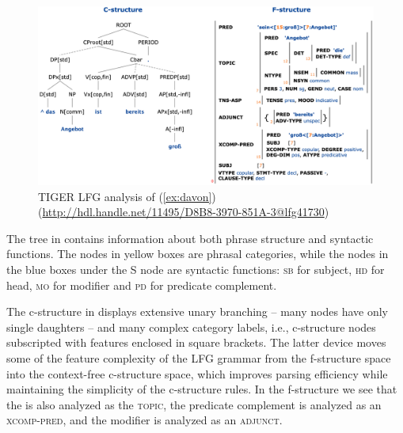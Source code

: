 \documentclass[output=paper,hidelinks]{langscibook}
\begin{document}
\begin{figure}
    \includegraphics[width=\textwidth]{figures/Treebanks/Angebot-LFG.png}
    \caption{TIGER LFG analysis of (\ref{ex:davon}) (\url{http://hdl.handle.net/11495/D8B8-3970-851A-3@lfg41730})}
    \label{fig:davon-tigerLFG}
\end{figure}

The tree in  contains information about both phrase structure and syntactic functions.
The nodes in yellow boxes are phrasal categories, while the nodes in the blue boxes under the S node are syntactic functions: %
\textsc{sb} for subject, \textsc{hd} for head, \textsc{mo} for modifier and \textsc{pd} for predicate complement.

The c-structure in  displays extensive unary branching -- many nodes have only single daughters -- and many complex category labels, i.e., c-structure nodes subscripted with features enclosed in square brackets.
The latter device moves some of the feature complexity of the LFG grammar from the f-structure space into the context-free c-structure space, which improves parsing efficiency while maintaining the simplicity of the c-structure rules.
In the f-structure we see that the \SUBJ is also analyzed as the \textsc{topic}, the predicate complement is analyzed as an \textsc{xcomp-pred}, and the modifier is analyzed as an \textsc{adjunct}.



\end{document}
